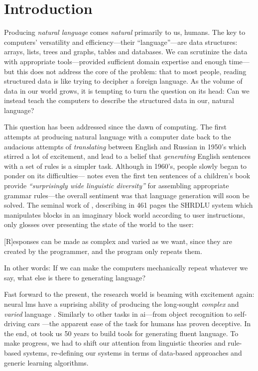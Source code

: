 \chapter{Introduction}
\label{chap:intro}
Producing \emph{natural language} comes \emph{natural} primarily to us, humans.
The key to computers' versatility and efficiency---their ``language''---are data structures: arrays, lists, trees and graphs, tables and databases.
We can scrutinize the data with appropriate tools---provided sufficient domain expertise and enough time---but this does not address the core of the problem: that to most people, reading structured data is like trying to decipher a foreign language. As the volume of data in our world grows, it is tempting to turn the question on its head: Can we instead teach the computers to describe the structured data in our, natural language?


This question has been addressed since the dawn of computing. The first attempts at producing natural language with a computer date back to the audacious attempts of \emph{translating} between English and Russian in 1950's \cite{sheridan1955research} which stirred a lot of excitement, and lead to a belief that \emph{generating} English sentences with a set of rules is a simpler task. Although in 1960's, people slowly began to ponder on its difficulties---\citet{yngve1961random} notes even the first ten sentences of a children's book provide \emph{``surprisingly wide linguistic diversity''} for assembling appropriate grammar rules---the overall sentiment was that language generation will soon be solved. The seminal work of \citet{winograd1971procedures}, describing in 461 pages the SHRDLU system which manipulates blocks in an imaginary block world according to user instructions, only glosses over presenting the state of the world to the user:
\begin{pquotation}{\citealp[p.384]{winograd1971procedures}}
    [R]esponses can be made as complex and varied as we want, since they are created by the programmer, and the program only repeats them.
\end{pquotation}
In other words: If we can make the computers mechanically repeat whatever we say, what else is there to generating language?

Fast forward to the present, the research world is beaming with excitement again: neural \acp{lm} have a suprising ability of producing the long-sought \emph{complex} and \emph{varied} language \cite{radford2019language,brown2020language}. Similarly to other tasks in \ac{ai}---from object recognition \cite{papert1966summer} to self-driving cars \cite{autonomouscars}---the apparent ease of the task for humans has proven deceptive. In the end, ot took us 50 years to build tools for generating fluent language. To make progress, we had to shift our attention from linguistic theories and rule-based systems, re-defining our systems in terms of data-based approaches and generic learning algorithms.

